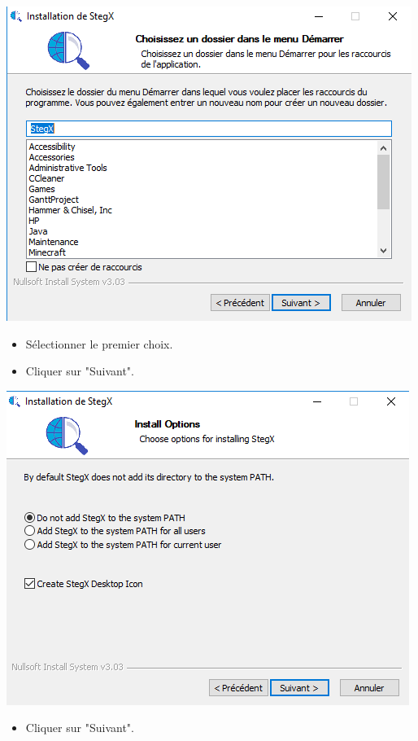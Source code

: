 \documentclass[11pt]{article}
\begin{document}
\hspace{1cm}
\includegraphics[scale=1]{pictures/debut.png}
\vspace{1cm}

\begin{itemize}
\item Sélectionner le premier choix. 
\item Cliquer sur "Suivant". 
\end{itemize}

\hspace{1cm}
\includegraphics[scale=1]{pictures/path.png}
\vspace{1cm}

\begin{itemize}
\item Cliquer sur "Suivant". 
\end{itemize}
\end{document}
